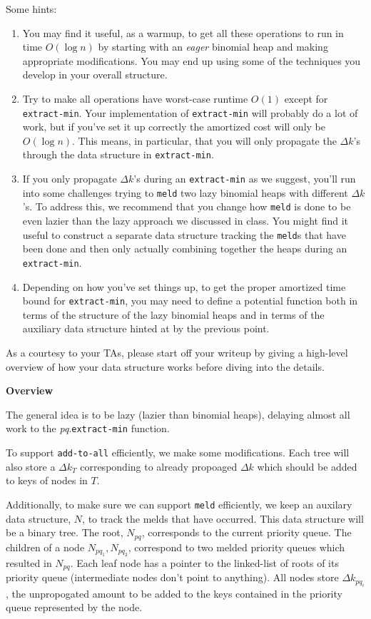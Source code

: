 \documentclass[12pt]{exam}
\begin{document}
\begin{questions}
Some hints:
\begin{enumerate}
\item You may find it useful, as a warmup, to get all these operations to run in time $O(\log n)$ by starting
with an \emph{eager} binomial heap and making appropriate modifications. You may end up using some
of the techniques you develop in your overall structure.
\item Try to make all operations have worst-case runtime $O(1)$ except for \texttt{extract-min}. Your implementation
of \texttt{extract-min} will probably do a lot of work, but if you've set it up correctly the
amortized cost will only be $O(\log n)$. This means, in particular, that you will only propagate the
$\Delta k$'s through the data structure in \texttt{extract-min}.
\item If you only propagate $\Delta k$'s during an \texttt{extract-min} as we suggest, you'll run into some challenges
trying to \texttt{meld} two lazy binomial heaps with different $\Delta k$'s. To address this, we recommend that
you change how \texttt{meld} is done to be even lazier than the lazy approach we discussed in class. You
might find it useful to construct a separate data structure tracking the \texttt{meld}s that have been done
and then only actually combining together the heaps during an \texttt{extract-min}.
\item Depending on how you've set things up, to get the proper amortized time bound for \texttt{extract-min},
you may need to define a potential function both in terms of the structure of the lazy binomial
heaps and in terms of the auxiliary data structure hinted at by the previous point.
\end{enumerate}

As a courtesy to your TAs, please start off your writeup by giving a high-level overview of how your data
structure works before diving into the details.

\begin{solution}

\textbf{Overview}

The general idea is to be lazy (lazier than binomial heaps), delaying almost all work to the \textit{pq}.\texttt{extract-min} function.

To support \texttt{add-to-all} efficiently, we make some modifications. Each tree will also store a $\Delta k_{T}$ corresponding to already propoaged $\Delta k$ which should be added to keys of nodes in $T$.

Additionally, to make sure we can support \texttt{meld} efficiently, we keep an auxilary data structure, $N$, to track the melds that have occurred. This data structure will be a binary tree. The root, $N_{pq}$, corresponds to the current priority queue. The children of a node $N_{pq_1}, N_{pq_2}$, correspond to two melded priority queues which resulted in $N_{pq}$. Each leaf node has a pointer to the linked-list of roots of its priority queue (intermediate nodes don't point to anything). All nodes store $\Delta k_{pq_i}$, the unpropogated amount to be added to the keys contained in the priority queue represented by the node.


\end{solution}
\end{questions}
\end{document}
